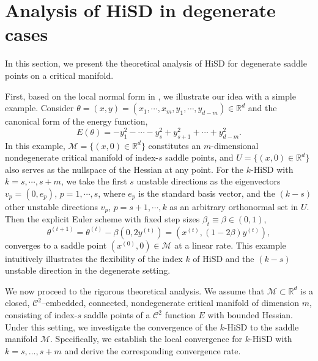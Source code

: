 \documentclass[final]{siamart251216}
\begin{document}
\section{Analysis of HiSD in degenerate cases}\label{sec:3}
In this section, we present the theoretical analysis of HiSD for degenerate saddle points on a critical manifold. 

First, based on the local normal form in , we illustrate our idea with a simple example. 
Consider $\theta = (x,y) = (x_1, \cdots, x_m, y_1, \cdots, y_{d-m}) \in\mathbb{R}^d$ and the canonical form of the energy function,
\begin{equation*}
E(\theta) = - y_1^2 - \cdots - y_s^2 + y_{s+1}^2 + \cdots + y_{d-m}^2.
\end{equation*}
In this example, $\mathcal{M} = \{(x,0)\in \mathbb{R}^d\}$ constitutes an $m$-dimensional nondegenerate critical manifold of index-$s$ saddle points, and $U=\{(x,0)\in \mathbb{R}^d\}$ also serves as the nullspace of the Hessian at any point. 
For the $k$-HiSD with $k=s,\cdots,s+m$, we take the first $s$ unstable directions as the eigenvectors $v_p = (0,e_p)$, $p=1,\cdots,s$, where $e_p$ is the standard basis vector, and the $(k-s)$ other unstable directions $v_p$, $p=s+1, \cdots,k$ as an arbitrary orthonormal set in $U$.
Then the explicit Euler scheme with fixed step sizes $\beta_t\equiv\beta\in(0,1)$,
\begin{equation*}
\theta^{(t+1)} = \theta^{(t)} - \beta\left(0, 2y^{(t)}\right) = \left(x^{(t)}, (1-2\beta)y^{(t)}\right),
\end{equation*}
converges to a saddle point $\left(x^{(0)}, 0\right)\in\mathcal{M}$ at a linear rate. 
This example intuitively illustrates the flexibility of the index $k$ of HiSD and the $(k-s)$ unstable direction in the degenerate setting. 

We now proceed to the rigorous theoretical analysis. 
We assume that $\mathcal{M}\subset\mathbb{R}^d$ is a closed, $\mathcal{C}^2$–embedded, connected, nondegenerate critical manifold of dimension $m$, consisting of index-$s$ saddle points of a $\mathcal{C}^2$ function $E$ with bounded Hessian. 
Under this setting, we investigate the convergence of the $k$-HiSD to the saddle manifold $\mathcal{M}$.
Specifically, we establish the local convergence for $k$-HiSD with $k=s,\dots,s+m$ and derive the corresponding convergence rate.
\end{document}
